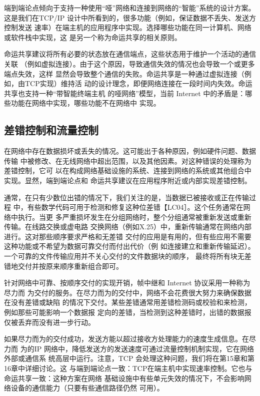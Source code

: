 端到端论点倾向于支持一种使用“哑”网络和连接到网络的“智能”系统的设计方案。
这是我们在TCP/IP 设计中所看到的，很多功能（例如，保证数据不丢失、发送方控制发送
速率）在端主机的应用程序中实现。选择哪些功能在同一计算机、网络或软件栈中实现，这
是另一个称为命运共享的相关原则\cite{clark1988design}。

命运共享建议将所有必要的状态放在通信端点，这些状态用于维护一个活动的通信关联
（例如虚拟连接）。由于这个原因，导致通信失效的情况也会导致一个或更多端点失效，这样
显然会导致整个通信的失败。命运共享是一种通过虚拟连接（例如，由TCP实现）维持活
动的设计理念，即便网络连接在一段时间内失效。命运共享也支持一种“带智能终端主机
的哑网络”模型，当前 Internet 中的矛盾是：哪些功能在网络中实现，哪些功能不在网络中
实现。

\subsection{差错控制和流量控制}

在网络中存在数据损坏或丢失的情况。这可能出于各种原因，例如硬件问题、数据传输
中被修改、在无线网络中超出范围，以及其他因素。对这种错误的处理称为差错控制，它可
以在构成网络基础设施的系统、连接到网络的系统或其他组合中实现。显然，端到端论点和
命运共享建议在应用程序附近或内部实现差错控制。

通常，在只有少数位出错的情况下，我们关注的是，当数据已被接收或正在传输过程
中，有些数学代码可用于检测和修复这种位差错【LC04］。这个任务通常在网络中执行。当更
多严重损坏发生在分组网络时，整个分组通常被重新发送或重新传输。在线路交换或虚电路
交换网络（例如X.25）中，重新传输通常在网络内部进行。这对那些顺序要求严格和无差错
交付的应用是有用的，但有些应用不需要这种功能或不希望为数据可靠交付而付出代价（例
如连接建立和重新传输延迟）。一个可靠的文件传输应用并不关心交付的文件数据块的顺序，
最终将所有块无差错地交付并按原来顺序重新组合即可。

针对网络中可靠、按顺序交付的实现开销，帧中继和 Internet 协议采用一种称为尽力而
为交付的服务。在尽力而为的交付中，网络不会花费很大努力来确保数据在没有差错或缺陷
的情况下交付。某些差错通常用差错检测码或校验和来检测，例如那些可能影响一个数据报
定向的差错，当检测到这种差错时，出错的数据报仅被丢弃而没有进一步行动。

如果尽力而为的交付成功，发送方能以超过接收方处理能力的速度生成信息。在尽力而
为的IP 网络中，降低发送方的发送速度可通过流量控制机制实现，它在网络外部或通信系
统高层中运行。注意，TCP 会处理这种问题，我们将在第15章和第16章中详细讨论。这
与端到端论点一致：TCP在端主机中实现速率控制。它也与命运共享一致：这种方案在网络
基础设施中有些单元失效的情况下，不会影响网络设备的通信能力（只要有些通信路径仍然
可用）。

